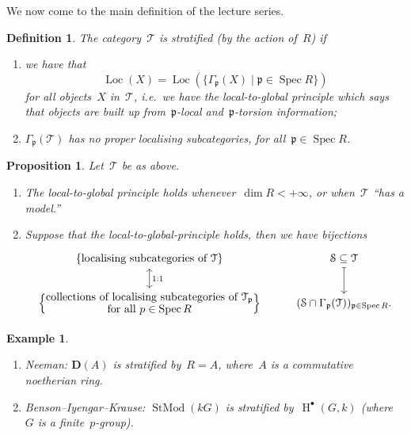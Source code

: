 \documentclass[10pt,a4paper]{article}
\theoremstyle{lecture}
\newtheorem{definition}[theorem]{Definition}
\newtheorem{example}[theorem]{Example}
\newtheorem{proposition}[theorem]{Proposition}
\newcommand\dash{\nobreakdash-\hspace{0pt}}
\newcommand\derived{\ensuremath{\mathbf{D}}}
\DeclareMathOperator\HH{H}
\DeclareMathOperator\Loc{Loc}
\DeclareMathOperator\Spec{Spec}
\DeclareMathOperator\StMod{StMod}
\begin{document}
We now come to the main definition of the lecture series.
\begin{definition}
  The category~$\mathcal{T}$ is \emph{stratified (by the action of~$R$)} if
  \begin{enumerate}
    \item we have that
      \begin{equation}
        \Loc(X)=\Loc(\{\Gamma_{\mathfrak{p}}(X)\mid\mathfrak{p}\in\Spec R\})
      \end{equation}
      for all objects~$X$ in~$\mathcal{T}$, i.e.\ we have the \emph{local-to-global principle} which says that objects are built up from~$\mathfrak{p}$\dash local and~$\mathfrak{p}$\dash torsion information;
    \item $\Gamma_{\mathfrak{p}}(\mathcal{T})$ has no proper localising subcategories, for all~$\mathfrak{p}\in\Spec R$.
  \end{enumerate}
\end{definition}

\begin{proposition}
  Let~$\mathcal{T}$ be as above.
  \begin{enumerate}
    \item The local-to-global principle holds whenever~$\dim R<+\infty$, or when~$\mathcal{T}$ ``has a model.''
    \item Suppose that the local-to-global-principle holds, then we have bijections
      \begin{equation}
        \begin{tikzcd}
          \left\{ \text{localising subcategories of $\mathcal{T}$} \right\} \arrow[leftrightarrow]{d}{1:1} & \mathcal{S}\subseteq\mathcal{T} \arrow[mapsto]{d} \\
          \left\{ \substack{\displaystyle\text{collections of localising subcategories of~$\mathcal{T}_{\mathfrak{p}}$} \\ \displaystyle\text{for all $p\in\Spec R$}} \right\} & (\mathcal{S}\cap\Gamma_{\mathfrak{p}}(\mathcal{T}))_{\mathfrak{p}\in\Spec R}.
        \end{tikzcd}
      \end{equation}
  \end{enumerate}
\end{proposition}

\begin{example} {\ }
  \begin{enumerate}
    \item Neeman: $\derived(A)$ is stratified by~$R=A$, where~$A$ is a commutative noetherian ring.
    \item Benson--Iyengar--Krause: $\StMod(kG)$ is stratified by~$\HH^\bullet(G,k)$ (where~$G$ is a finite~$p$\dash group).
  \end{enumerate}
\end{example}
\end{document}
